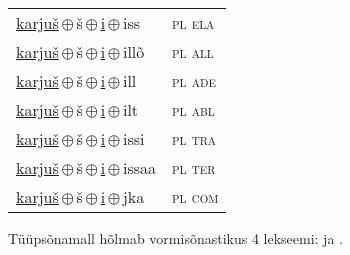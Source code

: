 \begin{minipage}{\textwidth}
\begin{sideways}
\begin{tabular}{l l}
\underline{karjuš}\,$\oplus$\,š\,$\oplus$\,\underline{i}\,$\oplus$\,iss & \textsc{ pl ela } \\
\underline{karjuš}\,$\oplus$\,š\,$\oplus$\,\underline{i}\,$\oplus$\,illõ & \textsc{ pl all } \\
\underline{karjuš}\,$\oplus$\,š\,$\oplus$\,\underline{i}\,$\oplus$\,ill & \textsc{ pl ade } \\
\underline{karjuš}\,$\oplus$\,š\,$\oplus$\,\underline{i}\,$\oplus$\,ilt & \textsc{ pl abl } \\
\underline{karjuš}\,$\oplus$\,š\,$\oplus$\,\underline{i}\,$\oplus$\,issi & \textsc{ pl tra } \\
\underline{karjuš}\,$\oplus$\,š\,$\oplus$\,\underline{i}\,$\oplus$\,issaa & \textsc{ pl ter } \\
\underline{karjuš}\,$\oplus$\,š\,$\oplus$\,\underline{i}\,$\oplus$\,jka & \textsc{ pl com } \\
\end{tabular}
\end{sideways}
\label{tab:tüüpsõnamall-karjušši}

\end{minipage}

 
\vspace{1em}
\noindent Tüüpsõnamall  hõlmab vormisõnastikus 4 lekseemi:  ja .
